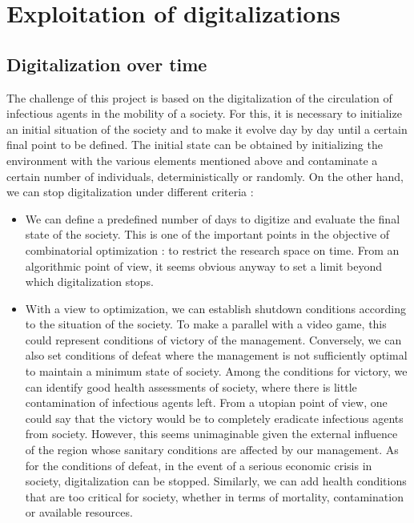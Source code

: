 \chapter{Exploitation of digitalizations}

\section{Digitalization over time}

The challenge of this project is based on the digitalization of the circulation of infectious agents in the mobility of a society. For this, it is necessary to initialize an initial situation of the society and to make it evolve day by day until a certain final point to be defined. The initial state can be obtained by initializing the environment with the various elements mentioned above and contaminate a certain number of individuals, deterministically or randomly. On the other hand, we can stop digitalization under different criteria :\\

\begin{itemize}

\item We can define a predefined number of days to digitize and evaluate the final state of the society. This is one of the important points in the objective of combinatorial optimization : to restrict the research space on time. From an algorithmic point of view, it seems obvious anyway to set a limit beyond which digitalization stops.

\item With a view to optimization, we can establish shutdown conditions according to the situation of the society. To make a parallel with a video game, this could represent conditions of victory of the management. Conversely, we can also set conditions of defeat where the management is not sufficiently optimal to maintain a minimum state of society. Among the conditions for victory, we can identify good health assessments of society, where there is little contamination of infectious agents left. From a utopian point of view, one could say that the victory would be to completely eradicate infectious agents from society. However, this seems unimaginable given the external influence of the region whose sanitary conditions are affected by our management. As for the conditions of defeat, in the event of a serious economic crisis in society, digitalization can be stopped. Similarly, we can add health conditions that are too critical for society, whether in terms of mortality, contamination or available resources.\\

\end{itemize}

